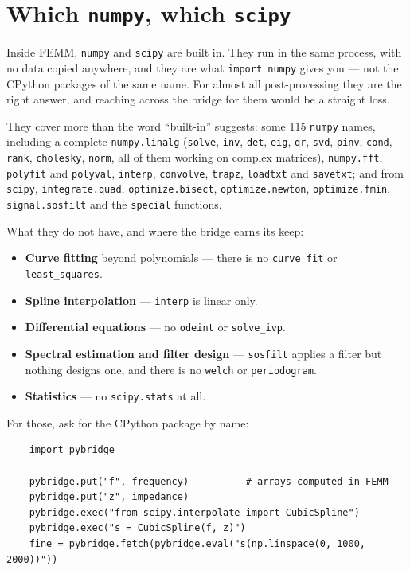 \section{Which {\tt numpy}, which {\tt scipy}}

Inside FEMM, {\tt numpy} and {\tt scipy} are built in.  They run in the same
process, with no data copied anywhere, and they are what {\tt import numpy}
gives you --- not the CPython packages of the same name.  For almost all
post-processing they are the right answer, and reaching across the bridge for
them would be a straight loss.

They cover more than the word ``built-in'' suggests: some 115 {\tt numpy}
names, including a complete {\tt numpy.linalg} ({\tt solve}, {\tt inv},
{\tt det}, {\tt eig}, {\tt qr}, {\tt svd}, {\tt pinv}, {\tt cond},
{\tt rank}, {\tt cholesky}, {\tt norm}, all of them working on complex
matrices), {\tt numpy.fft}, {\tt polyfit} and {\tt polyval},
{\tt interp}, {\tt convolve}, {\tt trapz}, {\tt loadtxt} and {\tt savetxt};
and from {\tt scipy}, {\tt integrate.quad}, {\tt optimize.bisect},
{\tt optimize.newton}, {\tt optimize.fmin}, {\tt signal.sosfilt} and the
{\tt special} functions.

What they do not have, and where the bridge earns its keep:

\begin{itemize}
\item{\bf Curve fitting} beyond polynomials --- there is no
{\tt curve\_fit} or {\tt least\_squares}.
\item{\bf Spline interpolation} --- {\tt interp} is linear only.
\item{\bf Differential equations} --- no {\tt odeint} or {\tt solve\_ivp}.
\item{\bf Spectral estimation and filter design} --- {\tt sosfilt} applies a
filter but nothing designs one, and there is no {\tt welch} or
{\tt periodogram}.
\item{\bf Statistics} --- no {\tt scipy.stats} at all.
\end{itemize}

For those, ask for the CPython package by name:

\begin{verbatim}
    import pybridge

    pybridge.put("f", frequency)          # arrays computed in FEMM
    pybridge.put("z", impedance)
    pybridge.exec("from scipy.interpolate import CubicSpline")
    pybridge.exec("s = CubicSpline(f, z)")
    fine = pybridge.fetch(pybridge.eval("s(np.linspace(0, 1000, 2000))"))
\end{verbatim}

